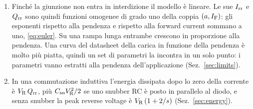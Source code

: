 \documentclass[10pt,a4paper]{scrartcl}
\let\newcommand\lmitdefine
\newcommand{\IF}{I_\mathrm{F}}
\newcommand{\VR}{V_\mathrm{R}}
\newcommand{\Irr}{I_\mathrm{rr}}
\newcommand{\Qrr}{Q_\mathrm{rr}}
\newcommand{\Csn}{C_\mathrm{sn}}
\begin{document}
\begin{enumerate}
\item Finché la giunzione non entra in interdizione il modello è lineare. Le sue $\Irr$ e $\Qrr$ sono quindi funzioni omogenee di grado uno della coppia $(a, \IF)$: gli esponenti rispetto alla pendenza e rispetto alla forward current sommano a uno, \eqref{eq:euler}. Su una rampa lunga entrambe crescono in proporzione alla pendenza. Una curva del datasheet della carica in funzione della pendenza è molto più piatta, quindi un set di parametri la incontra in un solo punto: i parametri vanno estratti alla pendenza dell'applicazione (Sez.~\ref{sec:limits}).
\item In una commutazione induttiva l'energia dissipata dopo lo zero della corrente è $\VR\,\Qrr$, più $\Csn\VR^2/2$ se uno snubber RC è posto in parallelo al diodo, e senza snubber la peak reverse voltage è $\VR\,(1+2/s)$ (Sez.~\ref{sec:energy}).
\end{enumerate}

\end{document}
